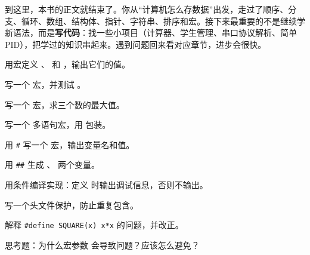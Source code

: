 \begin{tipbox}[写在最后]
到这里，本书的正文就结束了。你从“计算机怎么存数据”出发，走过了顺序、分支、循环、数组、结构体、指针、字符串、排序和宏。接下来最重要的不是继续学新语法，而是\textbf{写代码}：找一些小项目（计算器、学生管理、串口协议解析、简单 PID），把学过的知识串起来。遇到问题回来看对应章节，进步会很快。
\end{tipbox}

\begin{problemset}
  \item 用宏定义 、 和 ，输出它们的值。
  \item 写一个  宏，并测试 。
  \item 写一个  宏，求三个数的最大值。
  \item 写一个  多语句宏，用  包装。
  \item 用 \texttt{\#} 写一个  宏，输出变量名和值。
  \item 用 \texttt{\#\#} 生成 、 两个变量。
  \item 用条件编译实现：定义  时输出调试信息，否则不输出。
  \item 写一个头文件保护，防止重复包含。
  \item 解释 \texttt{\#define SQUARE(x) x*x} 的问题，并改正。
  \item 思考题：为什么宏参数  会导致问题？应该怎么避免？
\end{problemset}
